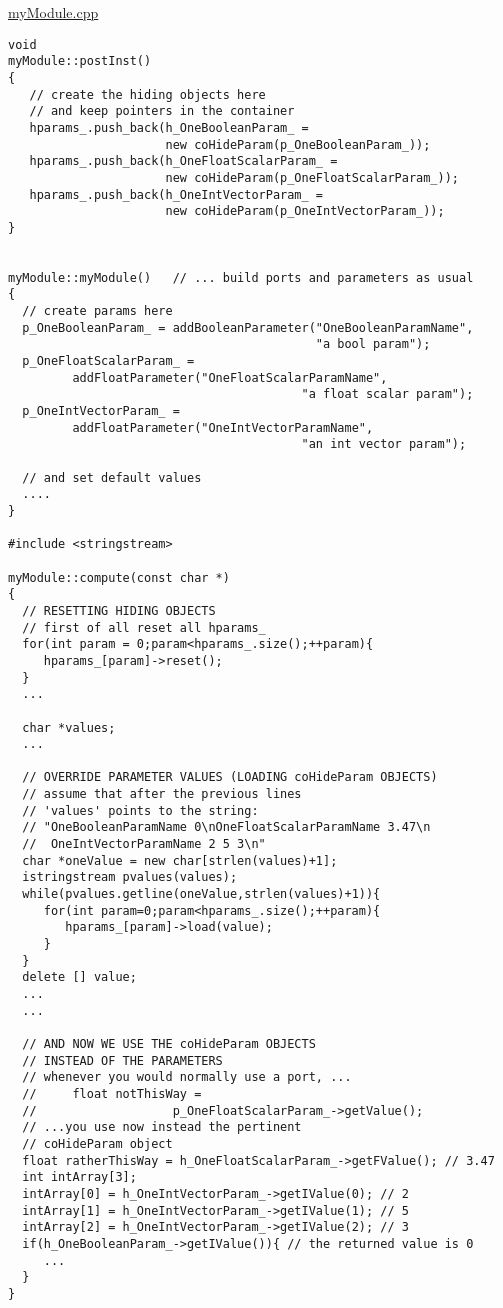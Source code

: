 \underline{myModule.cpp}

\begin{verbatim}
void
myModule::postInst()
{
   // create the hiding objects here 
   // and keep pointers in the container
   hparams_.push_back(h_OneBooleanParam_ = 
                      new coHideParam(p_OneBooleanParam_));
   hparams_.push_back(h_OneFloatScalarParam_ = 
                      new coHideParam(p_OneFloatScalarParam_));
   hparams_.push_back(h_OneIntVectorParam_ = 
                      new coHideParam(p_OneIntVectorParam_));
}


myModule::myModule()   // ... build ports and parameters as usual
{
  // create params here
  p_OneBooleanParam_ = addBooleanParameter("OneBooleanParamName",
                                           "a bool param");
  p_OneFloatScalarParam_ = 
         addFloatParameter("OneFloatScalarParamName",
                                         "a float scalar param");
  p_OneIntVectorParam_ = 
         addFloatParameter("OneIntVectorParamName",
                                         "an int vector param");
 
  // and set default values
  ....
}

#include <stringstream>

myModule::compute(const char *)   
{
  // RESETTING HIDING OBJECTS
  // first of all reset all hparams_
  for(int param = 0;param<hparams_.size();++param){
     hparams_[param]->reset();
  }
  ...

  char *values;
  ...

  // OVERRIDE PARAMETER VALUES (LOADING coHideParam OBJECTS)
  // assume that after the previous lines 
  // 'values' points to the string:
  // "OneBooleanParamName 0\nOneFloatScalarParamName 3.47\n
  //  OneIntVectorParamName 2 5 3\n"
  char *oneValue = new char[strlen(values)+1];
  istringstream pvalues(values);
  while(pvalues.getline(oneValue,strlen(values)+1)){
     for(int param=0;param<hparams_.size();++param){
        hparams_[param]->load(value);
     }
  }
  delete [] value;
  ...
  ...

  // AND NOW WE USE THE coHideParam OBJECTS 
  // INSTEAD OF THE PARAMETERS
  // whenever you would normally use a port, ...
  //     float notThisWay = 
  //                   p_OneFloatScalarParam_->getValue();
  // ...you use now instead the pertinent
  // coHideParam object
  float ratherThisWay = h_OneFloatScalarParam_->getFValue(); // 3.47
  int intArray[3];
  intArray[0] = h_OneIntVectorParam_->getIValue(0); // 2
  intArray[1] = h_OneIntVectorParam_->getIValue(1); // 5
  intArray[2] = h_OneIntVectorParam_->getIValue(2); // 3
  if(h_OneBooleanParam_->getIValue()){ // the returned value is 0
     ...
  }
}

\end{verbatim}

